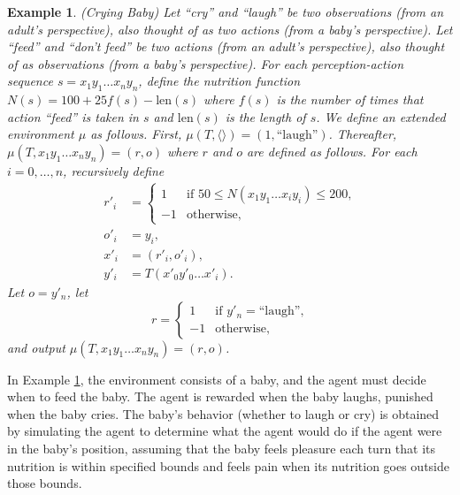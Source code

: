 \documentclass{article}
\newtheorem{myexample}[mytheorem]{Example}
\begin{document}
\begin{myexample}
\label{cryingbabyexample}
  (Crying Baby)
  Let ``cry'' and ``laugh'' be two observations (from an adult's perspective),
  also thought of as two actions (from a baby's perspective).
  Let ``feed'' and ``don't feed'' be two actions (from an adult's perspective),
  also thought of as observations (from a baby's perspective).
  For each perception-action sequence $s=x_1y_1\ldots x_ny_n$, define the
  nutrition function $N(s)=100+25f(s)-\mbox{len}(s)$ where $f(s)$ is the number
  of times that action ``feed'' is taken in $s$ and $\mbox{len}(s)$ is the length of $s$.
  We define an extended environment $\mu$ as follows.
  First, $\mu(T,\langle\rangle)=(1,\mbox{``laugh''})$.
  Thereafter, $\mu(T,x_1y_1\ldots x_ny_n)=(r,o)$ where $r$ and $o$ are defined as follows.
  For each $i=0,\ldots,n$, recursively define
  \begin{align*}
    r'_i &=
      \begin{cases}
        1 & \mbox{if $50 \leq N(x_1y_1\ldots x_iy_i)\leq 200$,}\\
        -1 & \mbox{otherwise,}
      \end{cases}\\
    o'_i &= y_i,\\
    x'_i &= (r'_i,o'_i),\\
    y'_i &= T(x'_0y'_0 \ldots x'_i).
  \end{align*}
  Let $o=y'_n$, let
  \[
    r=
      \begin{cases}
        1 & \mbox{if $y'_n=\mbox{``laugh''}$,}\\
        -1 & \mbox{otherwise,}
      \end{cases}
  \]
  and output $\mu(T,x_1y_1\ldots x_ny_n)=(r,o)$.
\end{myexample}

In Example \ref{cryingbabyexample}, the environment consists of a baby, and the
agent must decide when to feed the baby. The agent is rewarded when the baby laughs,
punished when the baby cries. The baby's behavior (whether to laugh or cry) is obtained
by simulating the agent to determine what the agent would do if the agent were in the
baby's position, assuming that the baby feels pleasure each turn that its nutrition is
within specified bounds and feels pain when its nutrition goes outside those bounds.
\end{document}
